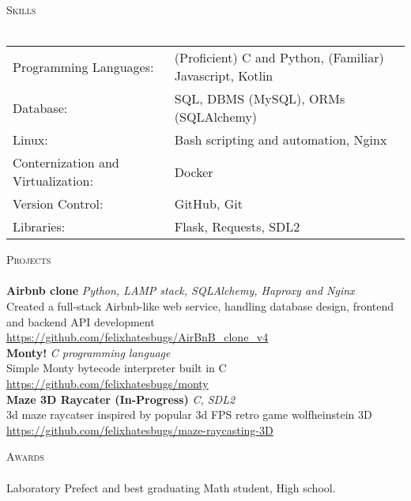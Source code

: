 \documentclass[a4paper]{article}
\newcommand{\lineunder} {
    \vspace*{-8pt} \\
    \hspace*{-18pt} \hrulefill \\
}
\newcommand{\header} [1] {
    {\hspace*{-18pt}\vspace*{6pt} \textsc{#1}}
    \vspace*{-6pt} \lineunder
}
\begin{document}
\header{Skills}
\begin{tabular}{ l l }
	Programming Languages:             & (Proficient) C and Python, (Familiar) Javascript, Kotlin \\
	Database:                          & SQL, DBMS (MySQL), ORMs (SQLAlchemy)                     \\
	Linux:                             & Bash scripting and automation, Nginx                     \\
	Conternization and Virtualization: & Docker                                                   \\
	Version Control:                   & GitHub, Git                                              \\
	Libraries:                         & Flask, Requests, SDL2                                    \\
\end{tabular}
\vspace{2mm}

\header{Projects}
{\textbf{Airbnb clone}} {\sl Python, LAMP stack, SQLAlchemy, Haproxy and Nginx} \\
Created a full-stack Airbnb-like web service, handling database design, frontend and backend API development\\
\url{https://github.com/felixhatesbugs/AirBnB_clone_v4} \\
\vspace*{2mm}
{\textbf{Monty!}} {\sl C programming language} \\
Simple Monty bytecode interpreter built in C\\
\url{https://github.com/felixhatesbugs/monty} \\
\vspace*{2mm}
{\textbf{Maze 3D Raycater (In-Progress)}} {\sl C, SDL2} \\
3d maze raycatser inspired by popular 3d FPS retro game wolfheinstein 3D\\
\url{https://github.com/felixhatesbugs/maze-raycasting-3D} \\
\vspace*{2mm}

\header{Awards}
Laboratory Prefect and best graduating Math student, High school.\\
\vspace*{2mm}

\ 
\end{document}

